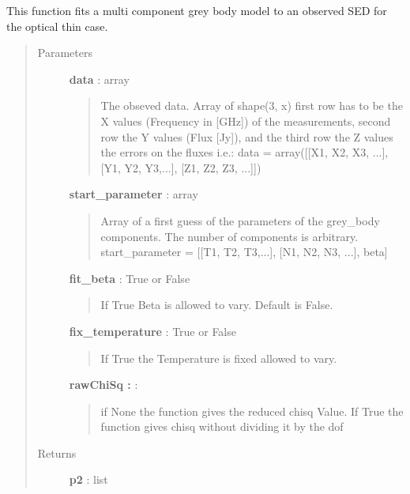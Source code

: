 \documentclass[a4paper,10pt,english]{sphinxmanual}
\begin{document}
\begin{fulllineitems}
\label{functions:astrolyze.functions.astro_functions.grey_body_fit}
This function fits a multi component grey body model to an observed SED for
the optical thin case.
\begin{quote}\begin{description}
\item[{Parameters }] \leavevmode
\textbf{data} : array
\begin{quote}

The obseved data. Array of shape(3, x) first row has to be the X values
(Frequency in {[}GHz{]}) of the measurements, second row the Y values
(Flux {[}Jy{]}), and the third row  the Z values the errors on the
fluxes i.e.:
data = array({[}{[}X1, X2, X3, ...{]}, {[}Y1, Y2, Y3,...{]}, {[}Z1, Z2,
Z3, ...{]}{]})
\end{quote}

\textbf{start\_parameter} : array
\begin{quote}

Array of a first guess of the parameters of the grey\_body components.
The number of components is arbitrary.
start\_parameter = {[}{[}T1, T2, T3,...{]}, {[}N1, N2, N3, ...{]}, beta{]}
\end{quote}

\textbf{fit\_beta} : True or False
\begin{quote}

If True Beta is allowed to vary. Default is False.
\end{quote}

\textbf{fix\_temperature} : True or False
\begin{quote}

If True the Temperature is fixed allowed to vary.
\end{quote}

\textbf{rawChiSq :} :
\begin{quote}

if None the function gives the reduced chisq Value. If True the
function gives chisq without dividing it by the dof
\end{quote}

\item[{Returns }] \leavevmode
\textbf{p2} : list
\begin{quote}


\end{quote}
\end{description}
\end{quote}
\end{fulllineitems}
\end{document}
